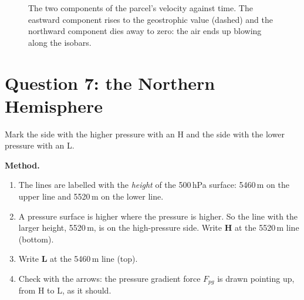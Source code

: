 \begin{figure}[ht]
\centering
{}
\caption{The two components of the parcel's velocity against time. The eastward component rises to the geostrophic value (dashed) and the northward component dies away to zero: the air ends up blowing along the isobars.}
\end{figure}

\section{Question 7: the Northern Hemisphere}

\begin{questionbox}
Mark the side with the higher pressure with an H and the side with the lower pressure with an L.
\end{questionbox}

\textbf{Method.}
\begin{enumerate}[label=\textbf{Step \arabic*.},leftmargin=*,itemsep=3pt]
\item The lines are labelled with the \emph{height} of the 500\,hPa surface: 5460\,m on the upper line and 5520\,m on the lower line.
\item A pressure surface is higher where the pressure is higher. So the line with the larger height, 5520\,m, is on the high-pressure side. Write \textbf{H} at the 5520\,m line (bottom).
\item Write \textbf{L} at the 5460\,m line (top).
\item Check with the arrows: the pressure gradient force $F_{pg}$ is drawn pointing up, from H to L, as it should.
\end{enumerate}

